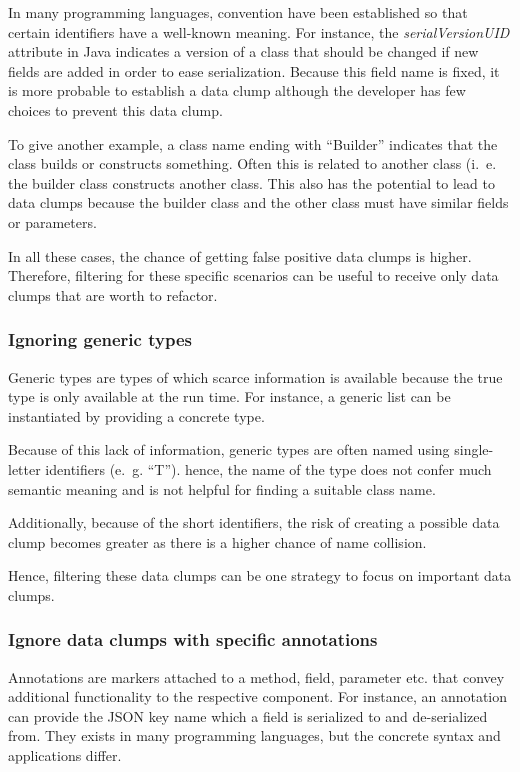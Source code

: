 In many programming languages, convention have been established so that certain identifiers have a well-known meaning. For instance, the \textit{serialVersionUID} attribute in Java indicates a version of a class that should be changed if new fields are added in order to ease serialization. Because this field name is fixed, it is more probable to establish a data clump although the developer has few choices to prevent this data clump.

To give another example, a class name ending with \enquote{Builder} indicates that the class builds or constructs something. Often this is related to another class (i.~e. the builder class constructs another class. This also has the potential to lead to data clumps because the builder class and the other class must have similar fields or parameters. 

In all these cases, the chance of getting false positive data clumps is higher. Therefore, filtering for these specific scenarios can be useful to receive only data clumps that are worth to refactor. 

\subsubsection{Ignoring generic types}
Generic types are types of which scarce information is available because the true type is only available at the run time. For instance, a generic list can be instantiated by providing a concrete type.

Because of this lack of information, generic types are often named using  single-letter identifiers (e.~g. \enquote{T}). hence, the name of the type does not confer much semantic meaning and is not helpful for finding a suitable class name. 

Additionally, because of the short identifiers, the risk of creating a possible data clump becomes greater as there is a higher chance of name collision.

Hence, filtering these data clumps can be one strategy to focus on important data clumps. 

\subsubsection{Ignore data clumps with specific annotations}

Annotations are markers attached to a method, field, parameter etc. that convey additional functionality to the respective component. For instance, an annotation can provide the \ac{JSON} key name which a field is serialized to and de-serialized from.  They exists in many programming languages, but the concrete syntax and applications differ.

